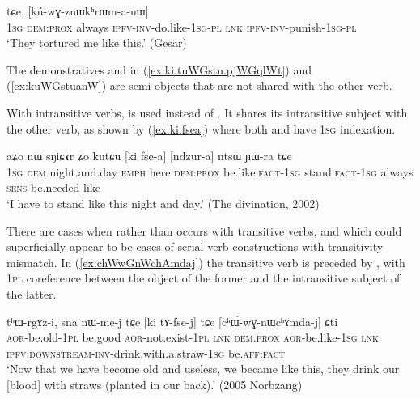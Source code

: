 \begin{exe}
\ex \label{ex:kuWGstuanW}
 tɕe, [kú-wɣ-znɯkʰrɯm-a-nɯ] \\
 \textsc{1sg} \textsc{dem}:\textsc{prox} always \textsc{ipfv}-\textsc{inv}-do.like-\textsc{1sg}-\textsc{pl} \textsc{lnk} \textsc{ipfv}-\textsc{inv}-punish-\textsc{1sg}-\textsc{pl} \\
 \glt `They tortured me like this.' (Gesar)
\end{exe}	

The demonstratives  and  in (\ref{ex:ki.tuWGstu.pjWGqlWt}) and (\ref{ex:kuWGstuanW}) are semi-objects that are not shared with the other verb.

With intransitive verbs,  is used instead of . It shares its intransitive subject with the other verb, as shown by (\ref{ex:ki.fsea}) where both  and  have \textsc{1sg} indexation.

\begin{exe}
\ex \label{ex:ki.fsea}
\gll aʑo nɯ sŋiɕɤr ʑo kutɕu [ki fse-a] [ndzur-a] ntsɯ ɲɯ-ra tɕe \\
\textsc{1sg} \textsc{dem} night.and.day \textsc{emph} here \textsc{dem}:\textsc{prox} be.like:\textsc{fact}-\textsc{1sg} stand:\textsc{fact}-\textsc{1sg} always \textsc{sens}-be.needed like \\
\glt `I have to stand like this night and day.' (The divination, 2002)
\end{exe}

There are cases when  rather than  occurs with transitive verbs, and which could superficially appear to be cases of serial verb constructions with transitivity mismatch.  In (\ref{ex:chWwGnWchAmdaj}) the transitive verb  is preceded by , with \textsc{1pl} coreference between the object of the former and the intransitive subject of the latter. 

\begin{exe}
\ex \label{ex:chWwGnWchAmdaj}
\gll tʰɯ-rgɤz-i, sna nɯ-me-j tɕe [ki tɤ-fse-j] tɕe [cʰɯ́-wɣ-nɯcʰɤmda-j] ɕti  \\
\textsc{aor}-be.old-\textsc{1pl} be.good \textsc{aor}-not.exist-\textsc{1pl} \textsc{lnk} \textsc{dem}.\textsc{prox} \textsc{aor}-be.like-\textsc{1sg} \textsc{lnk} \textsc{ipfv}:\textsc{downstream}-\textsc{inv}-drink.with.a.straw-\textsc{1sg} be.\textsc{aff}:\textsc{fact} \\
\glt `Now that we have become old and useless, we became like this, they drink our [blood] with straws (planted in our back).' (2005 Norbzang)
\end{exe}

